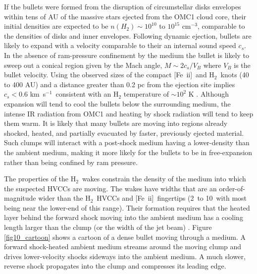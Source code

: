 \documentclass{aa}
\newcommand{\cmq}{cm{$^{-3}$}}
\newcommand{\kms}{km~s{$^{-1}$}}
\newcommand{\Feii}{[Fe~{\sc ii}]}
\newcommand{\hh}{\ensuremath{\textrm{H}_{2}}}			%
\begin{document}
If the bullets were formed from the disruption of circumstellar disks envelopes 
within tens of AU of the massive stars ejected from the OMC1 cloud core, 
their initial densities are expected to be  $n(H_2) \sim 10^{10}$ to $10^{15}$ \cmq , 
comparable to the densities of disks and inner envelopes.  Following dynamic ejection,  
bullets  are likely  to expand with a velocity comparable to their an internal sound 
speed $c_s$.  In the absence of ram-pressure confinement by the medium the bullet
is likely to sweep out a conical region given by the Mach angle,  $M \sim 2 c_s/ V_B$
where $V_B$ is the bullet velocity.   Using the observed sizes of the compact \Feii\ and \hh\ 
knots (40 to 400 AU)  and a distance greater than 0.2 pc from the ejection site implies 
$c_s < 0.6$ \kms\  consistent with an H$_2$ temperature of $\sim 10^2$ K .   Although 
expansion will tend to cool the bullets below the surrounding medium,
the intense IR radiation from OMC1 and  heating by shock radiation will tend to
keep them warm.   It is likely that many bullets are moving into regions already 
shocked, heated, and partially evacuated by faster, previously ejected material.  
Such clumps will  interact with a post-shock medium having a lower-density than 
the ambient medium, making it more likely  for the bullets to be in free-expansion
rather than  being confined by  ram pressure.    

The  properties of the \hh\  wakes  constrain the density of the 
medium into which the suspected HVCCs are moving.   The wakes have widths that are 
an order-of-magnitude wider than the \hh\ HVCCs and \Feii\  fingertips (2\arcsec\ to 10\arcsec\ 
with most being near the lower-end of this range).   Their formation requires 
that the heated layer behind the forward shock moving into the ambient medium
has a cooling length  larger than the clump  (or the width of
the  jet beam) \citep{Blondin1990}.       Figure \ref{fig10_cartoon}  shows a cartoon of a 
dense bullet moving through a medium.    A forward shock-heated  ambient medium  
streams around the moving clump and drives  lower-velocity shocks sideways 
into the ambient medium.   A much slower, reverse shock propagates into the clump
and compresses its leading edge. 
\end{document}
